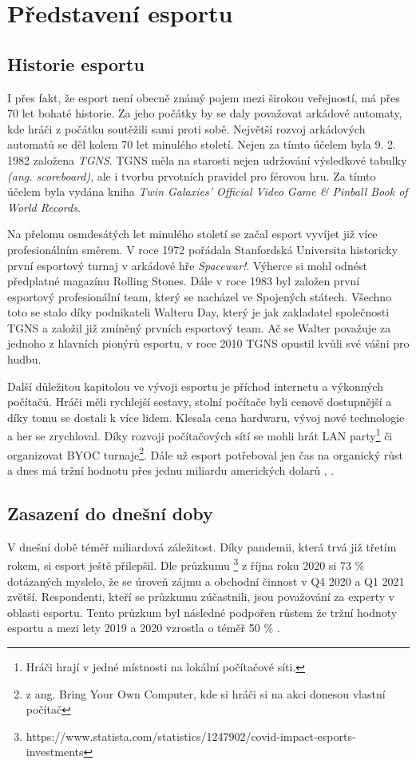 \chapter{Představení esportu}
\section{Historie esportu}
I přes fakt, že esport není obecně známý pojem mezi širokou veřejností, má přes 70 let bohaté historie. Za jeho počátky by se
daly považovat arkádové automaty, kde hráči z počátku soutěžili sami proti sobě. Největší rozvoj arkádových automatů se děl kolem 70 let minulého 
století. Nejen za tímto účelem byla 9. 2. 1982 založena \textit{\ac{TGNS}}. \ac{TGNS} měla na starosti nejen udržování výsledkové tabulky \textit{(ang. scoreboard)},
ale i tvorbu prvotních pravidel pro férovou hru. Za tímto účelem byla vydána kniha \textit{Twin Galaxies' Official Video Game \& Pinball Book of World Records}.

Na přelomu osmdesátých let minulého století se začal esport vyvíjet již více profesionálním směrem. V roce 1972 pořádala Stanfordská Universita historicky první
esportový turnaj v arkádové hře \textit{Spacewar!}. Výherce si mohl odnést předplatné magazínu Rolling Stones. Dále v roce 1983 byl založen první esportový profesionální team,
který se nacházel ve Spojených státech. Všechno toto se stalo díky podnikateli Walteru Day, který je jak zakladatel společnosti \ac{TGNS} a založil již zmíněný
prvních esportový team. Ač se Walter považuje za jednoho z hlavních pionýrů esportu, v roce 2010 \ac{TGNS} opustil kvůli své vášni pro hudbu.

Další důležitou kapitolou ve vývoji esportu je příchod internetu a výkonných počítačů. Hráči měli rychlejší sestavy, stolní počítače byli cenově dostupnější a díky tomu
se dostali k více lidem. Klesala cena hardwaru, vývoj nové technologie a her se zrychloval. Díky rozvoji počítačových sítí se mohli hrát LAN party\footnote{Hráči hrají v jedné
místnosti na lokální počítačové síti.} či organizovat BYOC turnaje\footnote{z ang. Bring Your Own Computer, kde si hráči si na akci donesou vlastní počítač}. Dále už esport 
potřeboval jen čas na organický růst a dnes má tržní hodnotu přes jednu miliardu amerických dolarů \cite{Gough2021}, \cite{Larch2019}.

\section{Zasazení do dnešní doby}
V dnešní době téměř miliardová záležitost. Díky pandemii, která trvá již třetím rokem, si esport ještě přilepšil. Dle průzkumu
\footnote{https://www.statista.com/statistics/1247902/covid-impact-esports-investments}
z října roku 2020 si 73 \% dotázaných myslelo, že se úroveň zájmu a obchodní činnost v Q4 2020 a Q1 2021
zvětší. Respondenti, kteří se průzkumu zúčastnili, jsou považování za experty v oblasti esportu. Tento průzkum byl následné podpořen růstem že tržní hodnoty esportu a mezi lety 2019 a 2020
vzrostla o téměř 50 \% \cite{Gough2021}.

